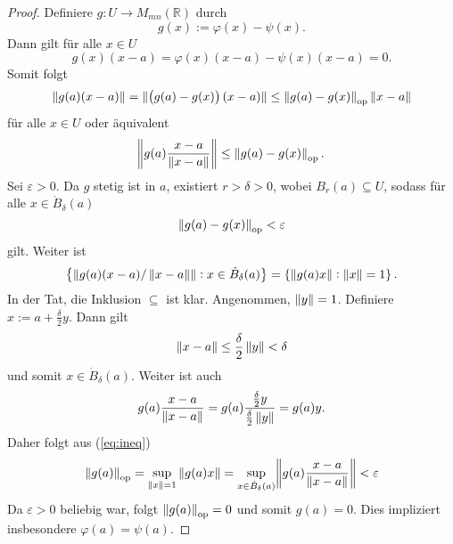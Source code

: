 \begin{proof}
	Definiere $g : U \to M_{mn}(\mathbb{R})$ durch
\begin{equation*}
g(x) := \varphi(x) - \psi(x).
\end{equation*}
Dann gilt für alle $x \in U$
\begin{equation*}
g(x)(x - a) = \varphi(x)(x - a) - \psi(x)(x - a) = 0.
\end{equation*}
Somit folgt
\begin{equation*}
\norm[0]{g(a)(x - a)} = \norm[0]{\del[1]{g(a) - g(x)}(x - a)} \leq \norm[0]{g(a) - g(x)}_\op \norm[0]{x - a}
\end{equation*}
\noindent für alle $x \in U$ oder äquivalent
\begin{equation}
\norm[3]{g(a)\frac{x - a}{\norm[0]{x - a}}} \leq \norm[0]{g(a) - g(x)}_{\mathrm{op}}.
\label{eq:ineq}
\end{equation}
Sei $\varepsilon > 0$. Da $g$ stetig ist in $a$, existiert $r >\delta > 0$, wobei $B_r(a) \subseteq U$, sodass für alle $x \in \dot{B}_\delta(a)$
\begin{equation*}
\norm[0]{g(a) - g(x)}_{\mathrm{op}} < \varepsilon 
\end{equation*}
\noindent gilt. Weiter ist
\begin{equation*}
\cbr[1]{\norm[0]{g(a)(x-a)/\norm[0]{x - a}} : x \in \dot{B}_\delta(a)} = \cbr[0]{\norm[0]{g(a)x} : \norm[0]{x} = 1}.
\end{equation*}
In der Tat, die Inklusion $\subseteq$ ist klar. Angenommen, $\norm[0]{y} = 1$. Definiere $x := a + \frac{\delta}{2}y$. Dann gilt
\begin{equation*}
\norm[0]{x - a} \leq \frac{\delta}{2}\norm[0]{y} < \delta
\end{equation*}
\noindent und somit $x \in \dot{B}_\delta(a)$. Weiter ist auch 
\begin{equation*}
g(a)\frac{x - a}{\norm[0]{x - a}} = g(a)\frac{\frac{\delta}{2}y}{\frac{\delta}{2}\norm[0]{y}} = g(a)y.
\end{equation*}
Daher folgt aus (\ref{eq:ineq})
\begin{equation*}
\norm[0]{g(a)}_{\mathrm{op}} = \sup_{\norm[0]{x} = 1}\norm[0]{g(a)x} = \sup_{x \in \dot{B}_\delta(a)}\norm[3]{g(a)\frac{x - a}{\norm[0]{x - a}}} < \varepsilon
\end{equation*}
Da $\varepsilon > 0$ beliebig war, folgt $\norm[0]{g(a)}_{\mathrm{op}} = 0$ und somit $g(a) = 0$. Dies impliziert insbesondere $\varphi(a) = \psi(a)$.	
\end{proof}

